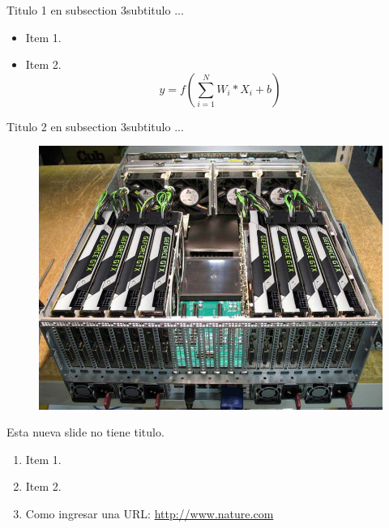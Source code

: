 \documentclass{beamer}
\begin{document}
\begin{frame}{Titulo 1 en subsection 3}{subtitulo ...}
\begin{itemize}
    
\item Item 1.
\item Item 2.
\begin{equation}
    y = f\left (\sum_{i=1}^{N} W_{i}*X_{i} + b \right)
\end{equation}
\end{itemize}
\end{frame}


\begin{frame}{Titulo 2 en subsection 3}{subtitulo ...}
    \begin{figure}[H]
        \includegraphics[scale=0.3]{figura3.png}
    \end{figure}
\end{frame}


\begin{frame}
Esta nueva slide no tiene titulo.

\begin{enumerate}
    \item Item 1.
    \item Item 2.
    \item Como ingresar una URL: \url{http://www.nature.com}
\end{enumerate}

\end{frame}
\end{document}
